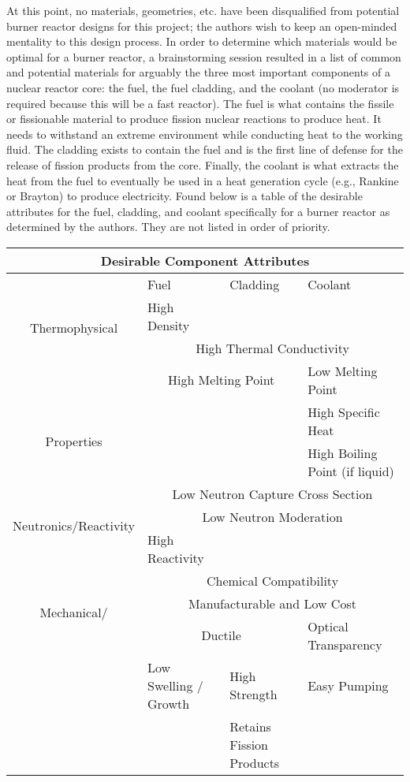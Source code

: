 \documentclass[]{report}
\begin{document}
At this point, no materials, geometries, etc. have been disqualified from potential burner reactor designs for this project;  the authors wish to keep an open-minded mentality to this design process.
In order to determine which materials would be optimal for a burner reactor, a brainstorming session resulted in a list of common and potential materials for arguably the three most important components of a nuclear reactor core: the fuel, the fuel cladding, and the coolant (no moderator is required because this will be a fast reactor). 
 The fuel is what contains the fissile or fissionable material to produce fission nuclear reactions to produce heat. It needs to withstand an extreme environment while conducting heat to the working fluid. %
 The cladding exists to contain the fuel and is the first line of defense for the release of fission products from the core.  Finally, the coolant is what extracts the heat from the fuel to eventually be used in a heat generation cycle (e.g., Rankine or Brayton) to produce electricity.
Found below is a table of the desirable attributes for the fuel, cladding, and coolant specifically for a burner reactor as determined by the authors.  They are not listed in order of priority.



\begin{center}
\begin{tabular}[c]{| c | p{2cm} | p{2cm} | p{2.0cm} |}
\hline
\multicolumn{4}{|c|}{Desirable Component Attributes} \\
\hline
 & Fuel & Cladding & Coolant \\
\hline
\hline
\multirow{2}{*}{Thermophysical} & High Density & &\\
\cline{2-4}
 & \multicolumn{3}{|c|}{High Thermal Conductivity} \\
\cline{2-4}
 & \multicolumn{2}{|c|}{High Melting Point} & Low Melting Point \\
\cline{2-4}
\multirow{2}{*}{Properties} & & & High Specific Heat \\
\cline{2-4}
 & & & High Boiling Point (if liquid) \\
\hline
\multirow{3}{*}{Neutronics/Reactivity} & \multicolumn{3}{|c|}{Low Neutron Capture Cross Section} \\
\cline{2-4}
 & \multicolumn{3}{|c|}{Low Neutron Moderation} \\
\cline{2-4}
 & High Reactivity & & \\
\hline
\multirow{3}{*}{Mechanical/} & \multicolumn{3}{|c|}{Chemical Compatibility}  \\ %
\cline{2-4}
 & \multicolumn{3}{|c|}{Manufacturable and Low Cost} \\
\cline{2-4}
\multirow{2}{*}{Chemical Properties} & \multicolumn{2}{|c|}{Ductile} & Optical Transparency \\ %
\cline{2-4}
 & Low Swelling / Growth & High Strength & Easy Pumping \\
\cline{2-4}
 &  & Retains Fission Products &  \\
\hline
\end{tabular}
\end{center}
\end{document}

